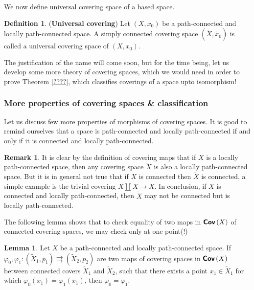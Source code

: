\documentclass[letterpaper,11pt,twoside]{article}
\theoremstyle{definition}
\theoremstyle{definition}
\newtheorem{definition}[proposition]{Definition}
\theoremstyle{definition}
\newtheorem{remark}[proposition]{\textbf{Remark}}
\theoremstyle{definition}
\newtheorem{lemma}[proposition]{\textbf{Lemma}}
\theoremstyle{definition}
\theoremstyle{definition}
\theoremstyle{remark}
\theoremstyle{definition}
\newcommand{\cat}[1]{{\fontfamily{lmss}\selectfont 
		\text{\textbf{#1}}
}}
\newcommand{\Cov}[1]{\cat{Cov}\left (#1\right )}
\begin{document}
We now define universal covering space of a based space.
\begin{definition}\label{D-6.1.3}
	(\textbf{Universal covering}) Let $ (X,x_0) $ be a path-connected and locally path-connected space. A simply connected covering space $ (\tilde{X},\tilde{x}_0) $ is called a universal covering space of $ (X,x_0) $. 
\end{definition}
The justification of the name will come soon, but for the time being, let us develop some more theory of covering spaces, which we would need in order to prove Theorem \ref{????}, which classifies coverings of a space upto isomorphism!
\subsubsection{More properties of covering spaces \& classification}
Let us discuss few more properties of morphisms of covering spaces. It is good to remind ourselves that a space is path-connected and locally path-connected if and only if it is connected and locally path-connected. 
\begin{remark}
	It is clear by the definition of covering maps that if $ X $ is a locally path-connected space, then any covering space $ \tilde{X} $ is also a locally path-connected space. But it is in general not true that if $ X $ is connected then $ \tilde{X} $ is connected, a simple example is the trivial covering $ X\amalg X\to X $. In conclusion, if $ X $ is connected and locally path-connected, then $ \tilde{X} $ may not be connected but is locally path-connected. 
\end{remark}
The following lemma shows that to check equality of two maps in $ \Cov{X} $ of connected covering spaces, we may check only at one point(!)
\begin{lemma}
	Let $ X $ be a path-connected and locally path-connected space. If $ \varphi_0,\varphi_1 : (\tilde{X}_1,p_1)  \rightrightarrows (\tilde{X}_2,p_2)$ are two maps of covering spaces in $ \Cov{X} $ between connected covers $ \tilde{X}_1 $ and $ \tilde{X}_2 $, such that there exists a point $ x_1\in \tilde{X}_1 $ for which $ \varphi_0(x_1) = \varphi_1(x_1) $, then $ \varphi_0 = \varphi_1 $. 
\end{lemma}
\end{document}
